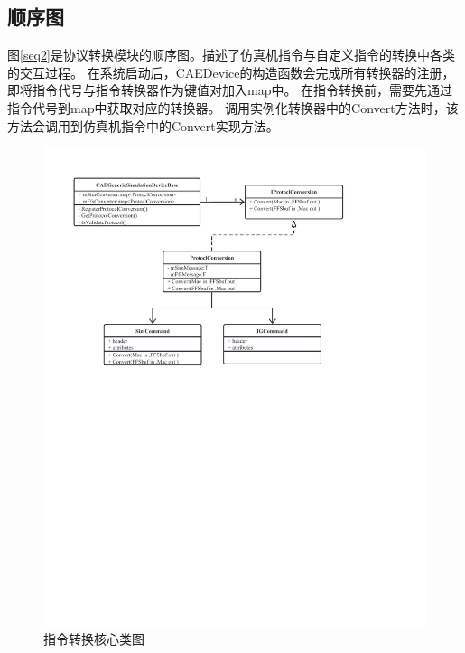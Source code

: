 \subsection{顺序图}
图\ref{seq2}是协议转换模块的顺序图。描述了仿真机指令与自定义指令的转换中各类的交互过程。
在系统启动后，CAEDevice的构造函数会完成所有转换器的注册，即将指令代号与指令转换器作为键值对加入map中。
在指令转换前，需要先通过指令代号到map中获取对应的转换器。
调用实例化转换器中的Convert方法时，该方法会调用到仿真机指令中的Convert实现方法。
\begin{figure}[h!]
    \begin{center}
        \includegraphics[width=\textwidth]{pictures/classdiagram2.pdf}
        \caption{指令转换核心类图}
        \label{module22}
    \end{center}
\end{figure}
\vspace{12pt}
